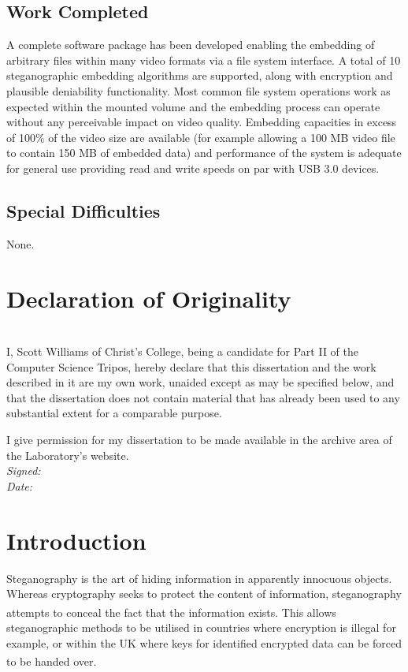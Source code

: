 \documentclass[paper=a4, fontsize=11pt,twoside]{scrartcl}
\numberwithin{table}{section}
\numberwithin{figure}{section}
\numberwithin{algorithm}{section}
\begin{document}
\subsection*{Work Completed}
A complete software package has been developed enabling the embedding of arbitrary files within many video formats via a file system interface. A total of 10 steganographic embedding algorithms are supported, along with encryption and plausible deniability functionality. Most common file system operations work as expected within the mounted volume and the embedding process can operate without any perceivable impact on video quality. Embedding capacities in excess of 100\% of the video size are available (for example allowing a 100 MB video file to contain 150 MB of embedded data) and performance of the system is adequate for general use providing read and write speeds on par with USB 3.0 devices.

\subsection*{Special Difficulties}
None.

\pagebreak
\section*{Declaration of Originality}
~\\[5pt]
I, Scott Williams of Christ's College, being a candidate for Part II of the Computer
Science Tripos, hereby declare that this dissertation and the work described
in it are my own work, unaided except as may be specified below, and that
the dissertation does not contain material that has already been used to any
substantial extent for a comparable purpose.

I give permission for my dissertation to be made available in the archive
area of the Laboratory's website.\\[20pt]
\textit{Signed:}\\[20pt]
\textit{Date:}
\clearpage

\tableofcontents
\vfill

\pagebreak
{} 
\section{Introduction}
Steganography is the art of hiding information in apparently innocuous objects. Whereas cryptography seeks to protect the content of information, steganography attempts to conceal the fact that the information exists\textsuperscript{\cite{digmedia}}. This allows steganographic methods to be utilised in countries where encryption is illegal for example, or within the UK where keys for identified encrypted data can be forced to be handed over\textsuperscript{\cite{uklaw}}.
\end{document}
